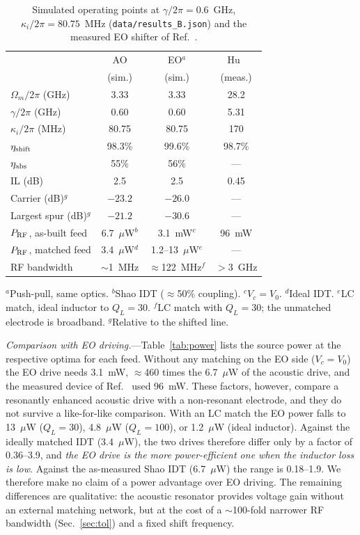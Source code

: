 \documentclass[aps,prapplied,reprint,superscriptaddress,amsmath,amssymb,floatfix]{revtex4-2}
\newcommand{\etash}{\eta_{\rm shift}}
\newcommand{\etaabs}{\eta_{\rm abs}}
\newcommand{\Pg}{P_{\rm RF}}
\begin{document}
\begin{table}[b]
\caption{Simulated operating points at $\gamma/2\pi=0.6$~GHz, $\kappa_i/2\pi=80.75$~MHz (\texttt{data/results\_B.json}) and the measured EO shifter of Ref.~\cite{Hu2021}.}
\label{tab:main}
\begin{ruledtabular}
\small
\begin{tabular}{lccc}
 & AO & EO$^{a}$ & Hu~\cite{Hu2021}\\
 & (sim.) & (sim.) & (meas.)\\
\hline
$\Omega_m/2\pi$ (GHz) & 3.33 & 3.33 & 28.2\\
$\gamma/2\pi$ (GHz) & 0.60 & 0.60 & 5.31\\
$\kappa_i/2\pi$ (MHz) & 80.75 & 80.75 & 170\\
$\etash$ & 98.3\% & 99.6\% & 98.7\%\\
$\etaabs$ & 55\% & 56\% & ---\\
IL (dB) & 2.5 & 2.5 & 0.45\\
Carrier (dB)$^{g}$ & $-23.2$ & $-26.0$ & ---\\
Largest spur (dB)$^{g}$ & $-21.2$ & $-30.6$ & ---\\
$\Pg$, as-built feed & 6.7~$\mu$W$^{b}$ & 3.1~mW$^{c}$ & 96~mW\\
$\Pg$, matched feed & 3.4~$\mu$W$^{d}$ & 1.2--13~$\mu$W$^{e}$ & ---\\
RF bandwidth & $\sim$1~MHz & $\approx$122~MHz$^{f}$ & $>$3~GHz\\
\end{tabular}
\end{ruledtabular}
\raggedright\footnotesize $^{a}$Push-pull, same optics. $^{b}$Shao IDT ($\approx$50\% coupling). $^{c}$$V_c=V_0$. $^{d}$Ideal IDT. $^{e}$LC match, ideal inductor to $Q_L=30$. $^{f}$LC match with $Q_L=30$; the unmatched electrode is broadband. $^{g}$Relative to the shifted line.
\end{table}

\emph{Comparison with EO driving.}---Table~\ref{tab:power} lists the source power at the respective optima for each feed. Without any matching on the EO side ($V_c=V_0$) the EO drive needs 3.1~mW, $\approx$460 times the 6.7~$\mu$W of the acoustic drive, and the measured device of Ref.~\cite{Hu2021} used 96~mW. These factors, however, compare a resonantly enhanced acoustic drive with a non-resonant electrode, and they do not survive a like-for-like comparison. With an LC match the EO power falls to 13~$\mu$W ($Q_L=30$), 4.8~$\mu$W ($Q_L=100$), or 1.2~$\mu$W (ideal inductor). Against the ideally matched IDT (3.4~$\mu$W), the two drives therefore differ only by a factor of 0.36--3.9, and \emph{the EO drive is the more power-efficient one when the inductor loss is low}. Against the as-measured Shao IDT (6.7~$\mu$W) the range is 0.18--1.9. We therefore make no claim of a power advantage over EO driving. The remaining differences are qualitative: the acoustic resonator provides voltage gain without an external matching network, but at the cost of a $\sim$100-fold narrower RF bandwidth (Sec.~\ref{sec:tol}) and a fixed shift frequency.
\end{document}
